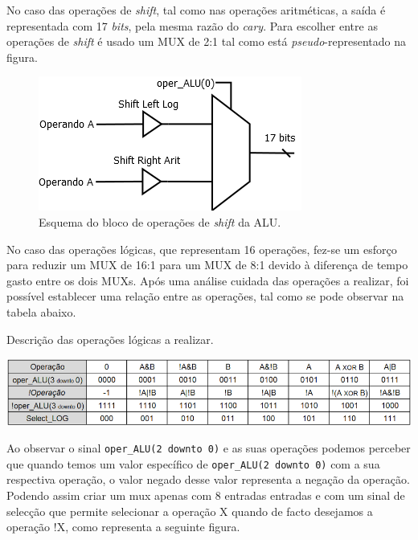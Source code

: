 \documentclass[11pt]{article}
\numberwithin{equation}{section}
\begin{document}
No caso das operações de \textit{shift}, tal como nas operações aritméticas, a saída é representada com 17 \textit{bits}, pela mesma razão do \textit{cary}. Para escolher entre as operações de \textit{shift} é usado um MUX de 2:1 tal como está \textit{pseudo}-representado na figura.

\begin{figure}[H]
	\centering
	\includegraphics[keepaspectratio=true, scale=0.40]{imagens/Shift}
	\caption{Esquema do bloco de operações de \textit{shift} da ALU.}
	\vspace{-0.8em}
\end{figure}

No caso das operações lógicas, que representam 16 operações, fez-se um esforço para reduzir um MUX de 16:1 para um MUX de 8:1 devido à diferença de tempo gasto entre os dois MUXs. Após uma análise cuidada das operações a realizar, foi possível establecer uma relação entre as operações, tal como se pode observar na tabela abaixo.

\begin{table}[h]
	\centering
	\caption{Descrição das operações lógicas a realizar.}
	\vspace{-2mm}
 	\includegraphics[keepaspectratio=true, scale=0.35]{tabelas/MUX8-1}
\end{table}

Ao observar o sinal \texttt{oper\_ALU(2 {\footnotesize downto} 0)} e as suas operações podemos perceber que quando temos um valor específico de \texttt{oper\_ALU(2 {\footnotesize downto} 0)} com a sua respectiva operação, o valor negado desse valor representa a negação da operação. Podendo assim criar um mux apenas com 8 entradas entradas e com um sinal de selecção que permite selecionar a operação X quando de facto desejamos a operação !X, como representa a seguinte figura.
\end{document}
